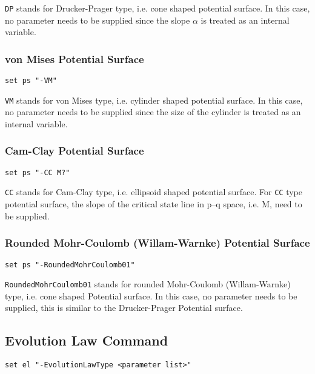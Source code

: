\texttt{DP}  stands  for  Drucker-Prager type, i.e. cone shaped
potential  surface.  In  this  case,  no  parameter needs to be
supplied  since  the  slope  $\alpha$ is treated as an internal
variable.

\subsubsection{von Mises Potential Surface} 
\label{vm_ps}
\begin{verbatim}
set ps "-VM"
\end{verbatim}

\texttt{VM}  stands  for  von  Mises type, i.e. cylinder shaped
potential  surface.  In  this  case,  no  parameter needs to be
supplied  since  the  size  of  the  cylinder  is treated as an
internal variable.

\subsubsection{Cam-Clay Potential Surface} 
\label{cc_ps}
\begin{verbatim}
set ps "-CC M?"
\end{verbatim}

\texttt{CC}  stands  for  Cam-Clay  type, i.e. ellipsoid shaped
potential  surface. For \texttt{CC} type potential surface, the
slope of the critical state line in p--q space, i.e. M, need to
be supplied.

\subsubsection{Rounded Mohr-Coulomb (Willam-Warnke) Potential Surface} 
\label{rmc01_ps}
\begin{verbatim}
set ps "-RoundedMohrCoulomb01"
\end{verbatim}

\texttt{RoundedMohrCoulomb01} stands for rounded Mohr-Coulomb (Willam-Warnke) type, 
i.e. cone shaped
Potential  surface. In this case, no parameter needs to be supplied, 
this is similar to the Drucker-Prager Potential surface.


\subsection{Evolution Law Command}
\label{EL_Command}

\begin{verbatim}
set el "-EvolutionLawType <parameter list>"
\end{verbatim}

